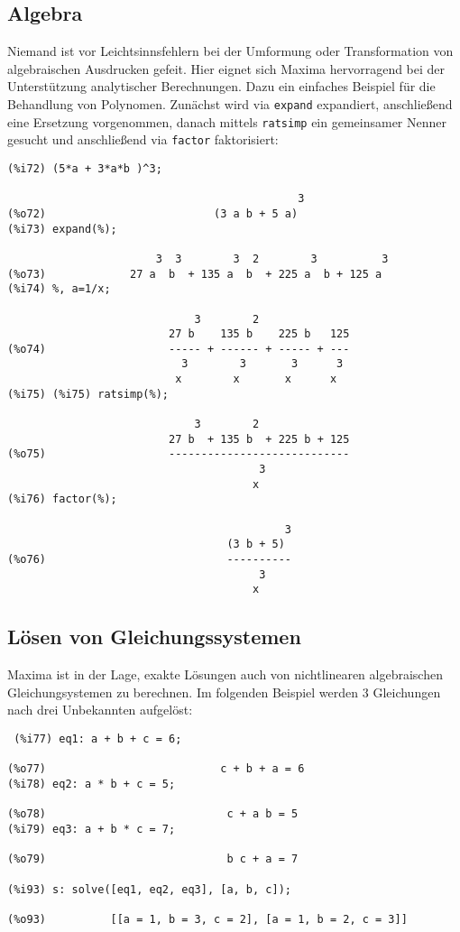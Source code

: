 \documentclass[ngerman,12pt]{scrartcl}
\begin{document}
\subsection{Algebra}

Niemand ist vor Leichtsinnsfehlern bei der Umformung oder
Transformation von algebraischen Ausdrucken gefeit. Hier eignet sich
Maxima hervorragend  bei der Unterstützung analytischer Berechnungen.
Dazu ein einfaches Beispiel für die Behandlung von Polynomen. Zunächst
wird via \texttt{expand} expandiert, anschließend eine Ersetzung vorgenommen,
danach mittels \texttt{ratsimp} ein gemeinsamer Nenner gesucht und
anschließend via \texttt{factor} faktorisiert:

\begin{verbatim}
(%i72) (5*a + 3*a*b )^3;

                                             3
(%o72)                          (3 a b + 5 a)
(%i73) expand(%);

                       3  3        3  2        3          3
(%o73)             27 a  b  + 135 a  b  + 225 a  b + 125 a
(%i74) %, a=1/x;

                             3        2
                         27 b    135 b    225 b   125
(%o74)                   ----- + ------ + ----- + ---
                           3        3       3      3
                          x        x       x      x
(%i75) (%i75) ratsimp(%);

                             3        2
                         27 b  + 135 b  + 225 b + 125
(%o75)                   ----------------------------
                                       3
                                      x
(%i76) factor(%);

                                           3
                                  (3 b + 5)
(%o76)                            ----------
                                       3
                                      x
\end{verbatim}

\subsection{Lösen von Gleichungssystemen}

Maxima ist in der Lage, exakte Lösungen auch von nichtlinearen
algebraischen  Gleichungsystemen zu berechnen. Im folgenden Beispiel
werden 3  Gleichungen nach drei Unbekannten aufgelöst:

\begin{verbatim}
 (%i77) eq1: a + b + c = 6;

(%o77)                           c + b + a = 6
(%i78) eq2: a * b + c = 5;

(%o78)                            c + a b = 5
(%i79) eq3: a + b * c = 7;

(%o79)                            b c + a = 7

(%i93) s: solve([eq1, eq2, eq3], [a, b, c]);

(%o93)          [[a = 1, b = 3, c = 2], [a = 1, b = 2, c = 3]]
\end{verbatim}
\end{document}
